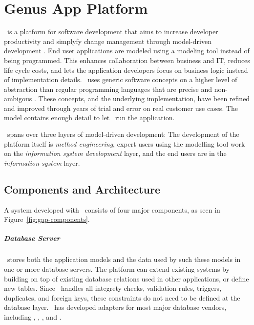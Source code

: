 \chapter{Genus App Platform}
\label{chap:Genus App Platform}

\gap~is a platform for software development that aims to increase developer productivity and simplyfy change management through model-driven development \cite{Genus_AS2016-kt}. End user applications are modeled using a modeling tool instead of being programmed. This enhances collaboration between business and IT, reduces life cycle costs, and lets the application developers focus on business logic instead of implementation details. \gap~uses generic software concepts on a higher level of abstraction than regular programming languages that are precise and non-ambigous \cite{noauthor_undated-qy}. These concepts, and the underlying implementation, have been refined and improved through years of trial and error on real customer use cases. The model contains enough detail to let \gap~run the application.

\gap~spans over three layers of model-driven development: The development of the platform itself is \textit{method engineering}, expert users using the modelling tool work on the \textit{information system development} layer, and the end users are in the \textit{information system} layer.


\section{Components and Architecture}
\label{sec:Components and Architecture}
A system developed with \gap~consists of four major components, as seen in Figure~\ref{fig:gap-components}.

\paragraph{Database Server}
\label{par:Database Server}
\gap~stores both the application models and the data used by such these models in one or more database servers. The platform can extend existing systems by building on top of existing database relations used in other applications, or define new tables. Since \gap~handles all integrety checks, validation rules, triggers, duplicates, and foreign keys, these constraints do not need to be defined at the database layer. \genus~has developed adapters for most major database vendors, including , , , and . 


